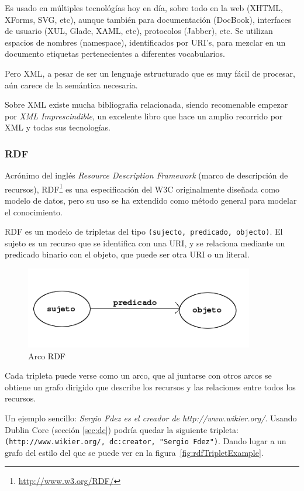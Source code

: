 Es usado en múltiples tecnológías hoy en día, sobre todo en la web (XHTML, XForms, 
SVG, etc), aunque también para documentación (DocBook), interfaces de usuario (XUL,
Glade, XAML, etc), protocolos (Jabber), etc. Se utilizan espacios de nombres (namespace), 
identificados por URI's, para mezclar en un documento etiquetas pertenecientes a 
diferentes vocabularios.

Pero XML, a pesar de ser un lenguaje estructurado que es muy fácil de procesar, 
aún carece de la semántica necesaria. 

Sobre XML existe mucha bibliografia relacionada, siendo recomenable empezar por
\emph{XML Imprescindible}\cite{XMLNutshell}, un excelente libro que hace un amplio
recorrido por XML y todas sus tecnologías.

\subsubsection{RDF}

Acrónimo del inglés \emph{Resource Description Framework} (marco de descripción 
de recursos), RDF\footnote{\url{http://www.w3.org/RDF/}} es una especificación del 
W3C originalmente diseñada como modelo de datos, pero su uso se ha extendido como
método general para modelar el conocimiento.

RDF es un modelo de tripletas del tipo \texttt{(sujecto, predicado, objecto)}. El
sujeto es un recurso que se identifica con una URI, y se relaciona mediante un 
predicado binario con el objeto, que puede ser otra URI o un literal.

\begin{figure}[H]
	\centering
	\includegraphics[width=10cm]{images/arc.png}
	\caption{Arco RDF}
	\label{fig:rdfTriplet}
\end{figure}

Cada tripleta puede verse como un arco, que al juntarse con otros arcos se obtiene
un grafo dirigido que describe los recursos y las relaciones entre todos los 
recursos.

Un ejemplo sencillo: \textit{Sergio Fdez es el creador de http://www.wikier.org/}. 
Usando Dublin Core (sección \ref{sec:dc}) podría quedar la siguiente tripleta: 
\texttt{(http://www.wikier.org/, dc:creator, "Sergio Fdez")}. Dando lugar a un 
grafo del estilo del que se puede ver en la figura~\ref{fig:rdfTripletExample}.


